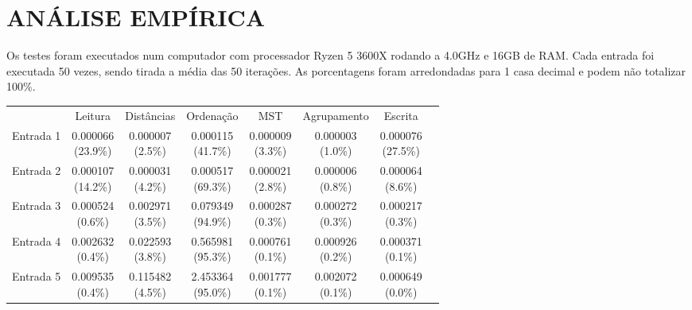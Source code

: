 \chapter{ANÁLISE EMPÍRICA}\label{cap-analise-empirica}

Os testes foram executados num computador com processador Ryzen 5 3600X rodando a 4.0GHz e 16GB de RAM. Cada entrada foi executada 50 vezes, sendo tirada a média das 50 iterações. As porcentagens foram arredondadas para 1 casa decimal e podem não totalizar 100\%.
\renewcommand\cellgape{\Gape[2pt]}
\begin{table}[h]
\centering
\begin{tabular}{lccccccc}
\toprule
{} &   Leitura &  Distâncias &  Ordenação &       MST &  Agrupamento &   Escrita \\

Entrada 1 & \mc{0.000066 \\ (23.9\%)}
&   \mc{0.000007 \\ (2.5\%)}
&   \mc{0.000115 \\ (41.7\%)}
&   \mc{0.000009 \\ (3.3\%)}
&   \mc{0.000003 \\ (1.0\%)}
&   \mc{0.000076 \\ (27.5\%)}
\\
Entrada 2 & \mc{0.000107 \\ (14.2\%)}
&   \mc{0.000031 \\ (4.2\%)}
&   \mc{0.000517 \\ (69.3\%)}
&   \mc{0.000021 \\ (2.8\%)}
&   \mc{0.000006 \\ (0.8\%)}
&   \mc{0.000064 \\ (8.6\%)}
\\
Entrada 3 & \mc{0.000524 \\ (0.6\%)}
&   \mc{0.002971 \\ (3.5\%)}
&   \mc{0.079349 \\ (94.9\%)}
&   \mc{0.000287 \\ (0.3\%)}
&   \mc{0.000272 \\ (0.3\%)}
&   \mc{0.000217 \\ (0.3\%)}
\\
Entrada 4 & \mc{0.002632 \\ (0.4\%)}
&   \mc{0.022593 \\ (3.8\%)}
&   \mc{0.565981 \\ (95.3\%)}
&   \mc{0.000761 \\ (0.1\%)}
&   \mc{0.000926 \\ (0.2\%)}
&   \mc{0.000371 \\ (0.1\%)}
\\
Entrada 5 & \mc{0.009535 \\ (0.4\%)}
&   \mc{0.115482 \\ (4.5\%)}
&   \mc{2.453364 \\ (95.0\%)}
&   \mc{0.001777 \\ (0.1\%)}
&   \mc{0.002072 \\ (0.1\%)}
&   \mc{0.000649 \\ (0.0\%)}
\\



\end{tabular}
\end{table}

